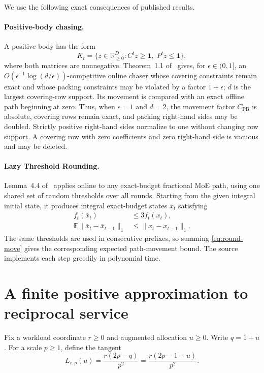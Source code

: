 \documentclass[11pt]{article}
\theoremstyle{remark}
\newcommand{\R}{\mathbb R}
\newcommand{\E}{\mathbb E}
\newcommand{\CPB}{C_{\mathrm{PB}}}
\begin{document}
We use the following exact consequences of published results.

\paragraph{Positive-body chasing.}
A positive body has the form
\[
 K_t=\{z\in\R_{\geq0}^{D}:C^tz\geq\mathbf1,\;P^tz\leq\mathbf1\},
\]
where both matrices are nonnegative.  Theorem~1.1 of~\cite{BBLS2023} gives,
for $\epsilon\in(0,1]$, an
$O(\epsilon^{-1}\log(d/\epsilon))$-competitive online chaser whose covering
constraints remain exact and whose packing constraints may be violated by a
factor $1+\epsilon$; $d$ is the largest covering-row support.  Its movement is
compared with an exact offline path beginning at zero.  Thus, when
$\epsilon=1$ and $d=2$, the movement factor $\CPB$ is absolute, covering rows
remain exact, and packing right-hand sides may be doubled.  Strictly positive
right-hand sides normalize to one without changing row support.  A covering
row with zero coefficients and zero right-hand side is vacuous and may be
deleted.

\paragraph{Lazy Threshold Rounding.}
Lemma~4.4 of~\cite{HLX2026} applies online to any exact-budget fractional MoE
path, using one shared set of random thresholds over all rounds.  Starting from
the given integral initial state, it produces integral exact-budget states
$\bar x_t$ satisfying
\begin{align}
 f_t(\bar x_t)&\leq3f_t(x_t),\label{eq:round-service}\\
 \E\lVert\bar x_t-\bar x_{t-1}\rVert_1
 &\leq\lVert x_t-x_{t-1}\rVert_1.\label{eq:round-move}
\end{align}
The same thresholds are used in consecutive prefixes, so summing
\eqref{eq:round-move} gives the corresponding expected path-movement bound.
The source implements each step greedily in polynomial time.

\section{A finite positive approximation to reciprocal service}

Fix a workload coordinate $r\geq0$ and augmented allocation $u\geq0$.  Write
$q=1+u$.  For a scale $p\geq1$, define the tangent
\[
 L_{r,p}(u)=\frac{r(2p-q)}{p^2}
           =\frac{r(2p-1-u)}{p^2}.
\]
\end{document}
